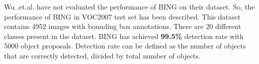 \par Wu .et.al.\cite{b5} have not evaluated the performance of BING on their dataset. So, the performance of BING \cite{b2} in VOC2007 test set has been described. This dataset contains 4952 images with bounding box annotations. There are 20 different classes present in the dataset. BING has achieved \textbf{99.5\%} detection rate with 5000 object proposals. Detection rate can be defined as the number of objects that are correctly detected, divided by total number of objects.


